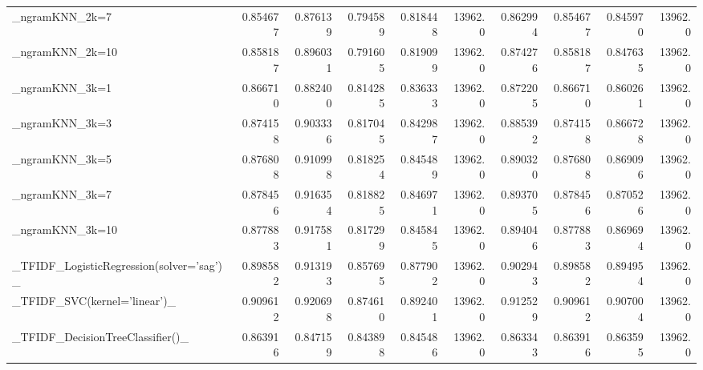 \begin{tabular}{lrrrrrrrrr}
\_ngramKNN\_2k=7                                     &  0.854677 &         0.876139 &      0.794589 &        0.818448 &        13962.0 &            0.862994 &         0.854677 &           0.845970 &           13962.0 \\
\_ngramKNN\_2k=10                                    &  0.858187 &         0.896031 &      0.791605 &        0.819099 &        13962.0 &            0.874276 &         0.858187 &           0.847635 &           13962.0 \\
\_ngramKNN\_3k=1                                     &  0.866710 &         0.882400 &      0.814285 &        0.836333 &        13962.0 &            0.872205 &         0.866710 &           0.860261 &           13962.0 \\
\_ngramKNN\_3k=3                                     &  0.874158 &         0.903336 &      0.817045 &        0.842987 &        13962.0 &            0.885392 &         0.874158 &           0.866728 &           13962.0 \\
\_ngramKNN\_3k=5                                     &  0.876808 &         0.910998 &      0.818254 &        0.845489 &        13962.0 &            0.890320 &         0.876808 &           0.869096 &           13962.0 \\
\_ngramKNN\_3k=7                                     &  0.878456 &         0.916354 &      0.818825 &        0.846971 &        13962.0 &            0.893705 &         0.878456 &           0.870526 &           13962.0 \\
\_ngramKNN\_3k=10                                    &  0.877883 &         0.917581 &      0.817299 &        0.845845 &        13962.0 &            0.894046 &         0.877883 &           0.869694 &           13962.0 \\
\_TFIDF\_LogisticRegression(solver='sag')\_           &  0.898582 &         0.913193 &      0.857695 &        0.877902 &        13962.0 &            0.902943 &         0.898582 &           0.894954 &           13962.0 \\
\_TFIDF\_SVC(kernel='linear')\_                       &  0.909612 &         0.920698 &      0.874610 &        0.892401 &        13962.0 &            0.912529 &         0.909612 &           0.907004 &           13962.0 \\
\_TFIDF\_DecisionTreeClassifier()\_                   &  0.863916 &         0.847159 &      0.843898 &        0.845486 &        13962.0 &            0.863343 &         0.863916 &           0.863595 &           13962.0 \\

\end{tabular}
